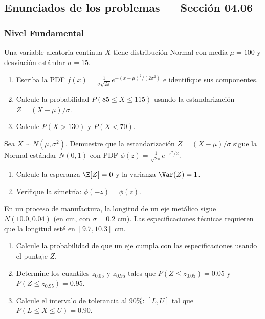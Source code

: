
\subsection*{Enunciados de los problemas --- Sección 04.06}

\subsubsection*{Nivel Fundamental}

\begin{problema}
	\label{prob:4.6.1}
	Una variable aleatoria continua $X$ tiene distribución Normal con media $\mu = 100$ y desviación estándar $\sigma = 15$.
	\begin{enumerate}
		\item Escriba la PDF $f(x) = \frac{1}{\sigma\sqrt{2\pi}} e^{-(x-\mu)^{2}/(2\sigma^{2})}$ e identifique sus componentes.
		\item Calcule la probabilidad $P(85 \le X \le 115)$ usando la estandarización $Z = (X - \mu)/\sigma$.
		\item Calcule $P(X > 130)$ y $P(X < 70)$.
	\end{enumerate}
\end{problema}

\begin{problema}
	\label{prob:4.6.2}
	Sea $X \sim N(\mu, \sigma^{2})$. Demuestre que la estandarización $Z = (X - \mu)/\sigma$ sigue la Normal estándar $N(0, 1)$ con PDF $\phi(z) = \frac{1}{\sqrt{2\pi}} e^{-z^{2}/2}$.
	\begin{enumerate}
		\item Calcule la esperanza $\E[Z] = 0$ y la varianza $\Var(Z) = 1$.
		\item Verifique la simetría: $\phi(-z) = \phi(z)$.
	\end{enumerate}
\end{problema}

\begin{problema}
	\label{prob:4.6.3}
	En un proceso de manufactura, la longitud de un eje metálico sigue $N(10.0, 0.04)$ (en cm, con $\sigma = 0.2$ cm). Las especificaciones técnicas requieren que la longitud esté en $[9.7, 10.3]$ cm.
	\begin{enumerate}
		\item Calcule la probabilidad de que un eje cumpla con las especificaciones usando el puntaje $Z$.
		\item Determine los cuantiles $z_{0.05}$ y $z_{0.95}$ tales que $P(Z \le z_{0.05}) = 0.05$ y $P(Z \le z_{0.95}) = 0.95$.
		\item Calcule el intervalo de tolerancia al 90\%: $[L, U]$ tal que $P(L \le X \le U) = 0.90$.
	\end{enumerate}
\end{problema}


